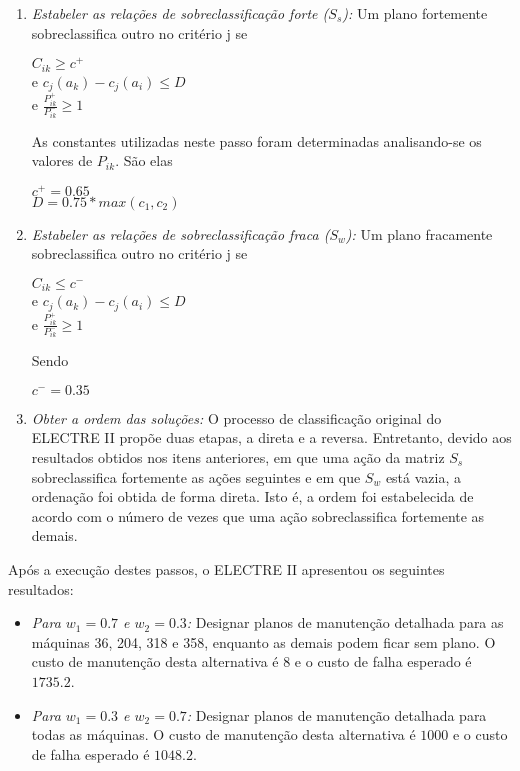 \begin{enumerate}
	\item {\it Estabeler as relações de sobreclassificação forte ($S_s$):}
		Um plano fortemente sobreclassifica outro no critério j se
		\begin{center}
			$C_{ik} \ge c^+$\\
			e $ c_j(a_k) - c_j(a_i) \le D $\\
			e $ \frac{P^+_{ik}}{P^-_{ik}} \ge 1$\\
		\end{center}
		
		As constantes utilizadas neste passo foram determinadas analisando-se os valores de $P_{ik}$. São elas
		
		\begin{center}
			$c^+= 0.65$\\
    		$D = 0.75 * max(c_1, c_2)$\\
		\end{center}
		
	\item {\it Estabeler as relações de sobreclassificação fraca ($S_w$):}
		Um plano fracamente sobreclassifica outro no critério j se
		\begin{center}
			$C_{ik} \le c^-$\\
			e $ c_j(a_k) - c_j(a_i) \le D $\\
			e $ \frac{P^+_{ik}}{P^-_{ik}} \ge 1$\\
		\end{center}
		
		Sendo
		
		\begin{center}
			$c^-= 0.35$\\
		\end{center}
		
	\item {\it Obter a ordem das soluções:} O processo de classificação original do ELECTRE II propõe duas etapas, a direta e a reversa. Entretanto, devido aos resultados obtidos nos itens anteriores, em que uma ação da matriz $S_s$ sobreclassifica fortemente as ações seguintes e em que $S_w$ está vazia, a ordenação foi obtida de forma direta. Isto é, a ordem foi estabelecida de acordo com o número de vezes que uma ação sobreclassifica fortemente as demais.
\end{enumerate}

Após a execução destes passos, o ELECTRE II apresentou os seguintes resultados:
\begin{itemize}
	\item {\it Para $w_1 = 0.7$ e $w_2 = 0.3$:} Designar planos de manutenção detalhada para as máquinas 36, 204, 318 e 358, enquanto as demais podem ficar sem plano. O custo de manutenção desta alternativa é $8$ e o custo de falha esperado é $1735.2$.
	\item {\it Para $w_1 = 0.3$ e $w_2 = 0.7$:} Designar planos de manutenção detalhada para todas as máquinas. O custo de manutenção desta alternativa é $1000$ e o custo de falha esperado é $1048.2$.
\end{itemize}